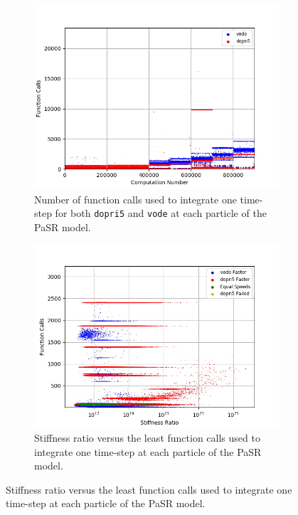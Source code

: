 \documentclass[12pt]{ussci}
\begin{document}
\begin{figure}[htbp]
    \centering
    \begin{subfigure}{0.43\textwidth}
        \includegraphics[width=\linewidth]{H2_CO/PaSR_Fn_Work_1e-06.png}
        \caption{Number of function calls used to integrate one time-step for both \texttt{dopri5} and \texttt{vode} at each particle of the PaSR model.}
        \label{fig:FWH2COPaSR}
    \end{subfigure}
    \hfill
    \begin{subfigure}{0.43\textwidth}
        \includegraphics[width=\linewidth]{H2_CO/PaSR_Fn_Work_Ratio_Groupings_1e-06.png}
        \caption{Stiffness ratio versus the least function calls used to integrate one time-step at each particle of the PaSR model.}

\end{subfigure}
\end{figure}
\end{document}
